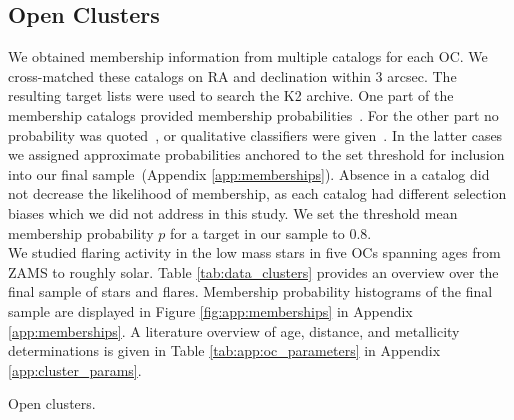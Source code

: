 \documentclass{aa}
\begin{document}
\subsection{Open Clusters}
We obtained membership information from multiple catalogs for each OC. We cross-matched these catalogs on RA and declination within 3 arcsec. The resulting target lists were used to search the K2 archive. One part of the membership catalogs provided membership probabilities~\citep{douglas_praesepe_hyades_2014, cantat_gaudin_2018, olivares_pleiades_2018, reino_hyades_2018, gao_m67mem_2018, olivares_ngc6774_2019}. For the other part no probability was quoted~\citep{rebull_rotation_2016, douglas_poking_2017, gaia_dr2_2018_hrd}, or qualitative classifiers were given~\citep{curtis_ruprecht_2013, gonzalez_m67mem_2016,rebull_praesepe_2017}. In the latter cases we assigned approximate probabilities anchored to the set threshold for inclusion into our final sample~(Appendix \ref{app:memberships}). Absence in a catalog did not decrease the likelihood of membership, as each catalog had different selection biases which we did not address in this study. We set the threshold mean membership probability $p$ for a target in our sample to 0.8.
\\
We studied flaring activity in the low mass stars in five OCs spanning ages from ZAMS to roughly solar. Table \ref{tab:data_clusters} provides an overview over the final sample of stars and flares. Membership probability histograms of the final sample are displayed in Figure \ref{fig:app:memberships} in Appendix \ref{app:memberships}. A literature overview of age, distance, and metallicity determinations is given in Table \ref{tab:app:oc_parameters} in Appendix \ref{app:cluster_params}. 
\begin{table}
\caption{Open clusters.}
\label{tab:data_clusters}
\centering

\end{table}
\end{document}
